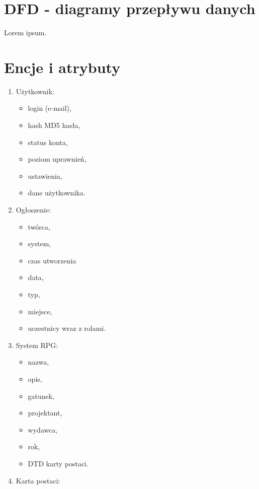 
\clearpage 
\section{DFD - diagramy przepływu danych}
\label{sec:DFD}

Lorem ipsum.


\section{Encje i atrybuty}
\label{sec:encje}

\begin{enumerate}
\item Użytkownik:
	\begin{itemize}
	\item login (e-mail),
	\item hash MD5 hasła,
	\item status konta,
	\item poziom uprawnień,
	\item ustawienia,
	\item dane użytkownika.
	\end{itemize}
\item Ogłoszenie:
	\begin{itemize}
	\item twórca,
	\item system,
	\item czas utworzenia
	\item data,
	\item typ,
	\item miejsce,
	\item uczestnicy wraz z rolami.
	\end{itemize}
\item System RPG:
	\begin{itemize}
	\item nazwa,
	\item opis,
	\item gatunek,
	\item projektant,
	\item wydawca,
	\item rok,
	\item DTD karty postaci.
	\end{itemize}
\item Karta postaci:
	\begin{itemize}

\end{itemize}
\end{enumerate}
